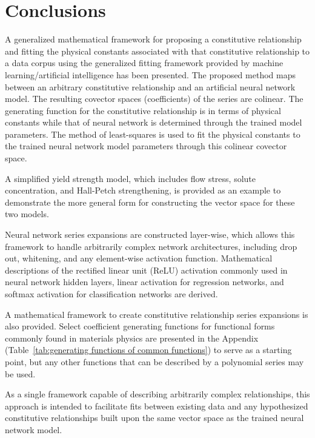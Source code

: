 \section{Conclusions}\label{conclusions}
A generalized mathematical framework for proposing a constitutive relationship and fitting the physical constants associated with that constitutive relationship to a data corpus using the generalized fitting framework provided by machine learning/artificial intelligence has been presented. The proposed method maps between an arbitrary constitutive relationship and an artificial neural network model. The resulting covector spaces (coefficients) of the series are colinear. The generating function for the constitutive relationship is in terms of physical constants while that of neural network is determined through the trained model parameters. The method of least-squares is used to fit the physical constants to the trained neural network model parameters through this colinear covector space.

A simplified yield strength model, which includes flow stress, solute concentration, and Hall-Petch strengthening, is provided as an example to demonstrate the more general form for constructing the vector space for these two models.

Neural network series expansions are constructed layer-wise, which allows this framework to handle arbitrarily complex network architectures, including drop out, whitening, and any element-wise activation function. Mathematical descriptions of the rectified linear unit (ReLU) activation commonly used in neural network hidden layers, linear activation for regression networks, and softmax activation for classification networks are derived.

A mathematical framework to create constitutive relationship series expansions is also provided. Select coefficient generating functions for functional forms commonly found in materials physics are presented in the Appendix (Table~\ref{tab:generating functions of common functions}) to serve as a starting point, but any other functions that can be described by a polynomial series may be used.

As a single framework capable of describing arbitrarily complex relationships, this approach is intended to facilitate fits between existing data and any hypothesized constitutive relationships built upon the same vector space as the trained neural network model.

